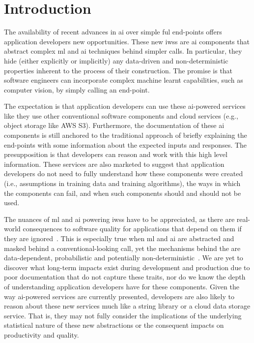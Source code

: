 \section{Introduction}

The availability of recent advances in \gls{ai} over simple ful end-points offers application developers new opportunities. These new \glspl{iws} are \gls{ai} components that abstract complex \gls{ml} and \gls{ai} techniques behind simpler  calls. In particular, they hide (either explicitly or implicitly) any data-driven and non-deterministic properties inherent to the process of their construction. The promise is that software engineers can incorporate complex machine learnt capabilities, such as computer vision, by simply calling an  end-point.

The expectation is that application developers can use these \gls{ai}-powered services like they use other conventional software components and cloud services (e.g., object storage like AWS S3). Furthermore, the documentation of these \gls{ai} components is still anchored to the traditional approach of briefly explaining the end-points with some information about the expected inputs and responses. The presupposition is that developers can reason and work with this high level information. These services are also marketed to suggest that application developers do not need to fully understand how these components were created (i.e., assumptions in training data and training algorithms), the ways in which the components can fail, and when such components should and should not be used.

The nuances of \gls{ml} and \gls{ai} powering \glspl{iws} have to be appreciated, as there are real-world consequences to software quality for applications that depend on them if they are ignored~\citep{Cummaudo:2019icsme}. This is especially true when \gls{ml} and \gls{ai} are abstracted and masked behind a conventional-looking  call, yet the mechanisms behind the  are data-dependent, probabilistic and potentially non-deterministic~\citep{Ohtake:2019vi}. We are yet to discover what long-term impacts exist during development and production due to poor documentation that do not capture these traits, nor do we know the depth of understanding application developers have for these components. Given the way \gls{ai}-powered services are currently presented, developers are also likely to reason about these new services much like a string library or a cloud data storage service. That is, they may not fully consider the implications of the underlying statistical nature of these new abstractions or the consequent impacts on productivity and quality.

